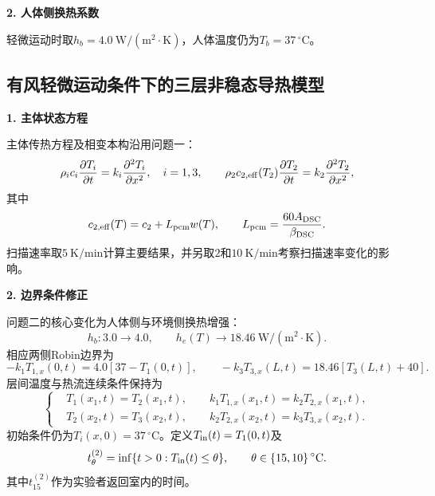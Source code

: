 \noindent\textbf{2. 人体侧换热系数}\par

轻微运动时取$h_b=4.0\ \mathrm{W/(m^2\cdot K)}$，人体温度仍为$T_b=37\,^{\circ}\mathrm C$。

\subsection{有风轻微运动条件下的三层非稳态导热模型}

\noindent\textbf{1. 主体状态方程}\par

主体传热方程及相变本构沿用问题一：
\begin{equation}
\rho_i c_i\frac{\partial T_i}{\partial t}=k_i\frac{\partial^2T_i}{\partial x^2},\quad i=1,3,
\qquad
\rho_2 c_{2,\rm eff}(T_2)\frac{\partial T_2}{\partial t}=k_2\frac{\partial^2T_2}{\partial x^2},
\label{eq:q2-governing}
\end{equation}
其中
\begin{equation}
c_{2,\rm eff}(T)=c_2+L_{\rm pcm}w(T),
\qquad
L_{\rm pcm}=\frac{60A_{\rm DSC}}{\beta_{\rm DSC}}.
\label{eq:q2-ceff}
\end{equation}
扫描速率取$5\ \mathrm{K/min}$计算主要结果，并另取$2$和$10\ \mathrm{K/min}$考察扫描速率变化的影响。

\noindent\textbf{2. 边界条件修正}\par

问题二的核心变化为人体侧与环境侧换热增强：
\begin{equation}
h_b:3.0\rightarrow4.0,\qquad h_e(T)\rightarrow18.46\ \mathrm{W/(m^2\cdot K)}.
\label{eq:q2-boundary-change}
\end{equation}
相应两侧Robin边界为
\begin{equation}
-k_1T_{1,x}(0,t)=4.0[37-T_1(0,t)],
\qquad
-k_3T_{3,x}(L,t)=18.46[T_3(L,t)+40].
\label{eq:q2-boundaries}
\end{equation}
层间温度与热流连续条件保持为
\begin{equation}
\left\{
\begin{aligned}
&T_1(x_1,t)=T_2(x_1,t),\qquad k_1T_{1,x}(x_1,t)=k_2T_{2,x}(x_1,t),\\
&T_2(x_2,t)=T_3(x_2,t),\qquad k_2T_{2,x}(x_2,t)=k_3T_{3,x}(x_2,t).
\end{aligned}
\right.
\label{eq:q2-interface}
\end{equation}
初始条件仍为$T_i(x,0)=37\,^{\circ}\mathrm C$。定义$T_{\rm in}(t)=T_1(0,t)$及
\begin{equation}
t_{\theta}^{(2)}=\inf\{t>0:T_{\rm in}(t)\le\theta\},
\qquad \theta\in\{15,10\}\,^{\circ}\mathrm C.
\label{eq:q2-threshold}
\end{equation}
其中$t_{15}^{(2)}$作为实验者返回室内的时间。

